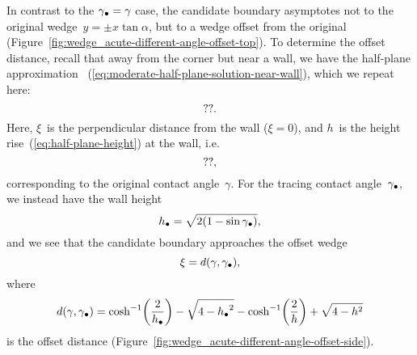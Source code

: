 In contrast to the $\gamma_\bullet = \gamma$ case,
the candidate boundary asymptotes
not to the original wedge~$y = \pm x \tan\alpha$,
but to a wedge offset from the original
(Figure~\ref{fig:wedge_acute-different-angle-offset-top}).
To determine the offset distance,
recall that away from the corner but near a wall,
we have the half-plane approximation~%
  (\ref{eq:moderate-half-plane-solution-near-wall}),
which we repeat here:
\begin{equation}
  \usecontent{eq:moderate-half-plane-solution-near-wall}.
    \label{eq:moderate-half-plane-solution-near-wall-repeat}
\end{equation}
Here, $\xi$~is the perpendicular distance from the wall ($\xi = 0$),
and $h$~is the height rise~(\ref{eq:half-plane-height}) at the wall,
i.e.
\begin{equation}
  \usecontent{eq:half-plane-height},
  \label{eq:half-plane-height-repeat}
\end{equation}
corresponding to the original contact angle~$\gamma$.
For the tracing contact angle~$\gamma_\bullet$,
we instead have the wall height
\begin{equation}
  h_\bullet = \sqrt{2 (1 - \sin\gamma_\bullet)},
  \label{eq:half-plane-height-different-angle}
\end{equation}
and we see that the candidate boundary approaches the offset wedge
\begin{equation}
  \xi = d (\gamma, \gamma_\bullet),
  \label{eq:moderate-offset-wedge}
\end{equation}
where
\begin{equation}
  d (\gamma, \gamma_\tr) =
    \cosh^{-1} \roundbr*{\frac{2}{h_\tr}} - \sqrt{4 - {h_\tr}^2}
    - \cosh^{-1} \roundbr*{\frac{2}{h}} + \sqrt{4 - h^2}
  \label{eq:moderate-offset-distance}
\end{equation}
is the offset distance
(Figure~\ref{fig:wedge_acute-different-angle-offset-side}).

\begin{figure}
\end{figure}

